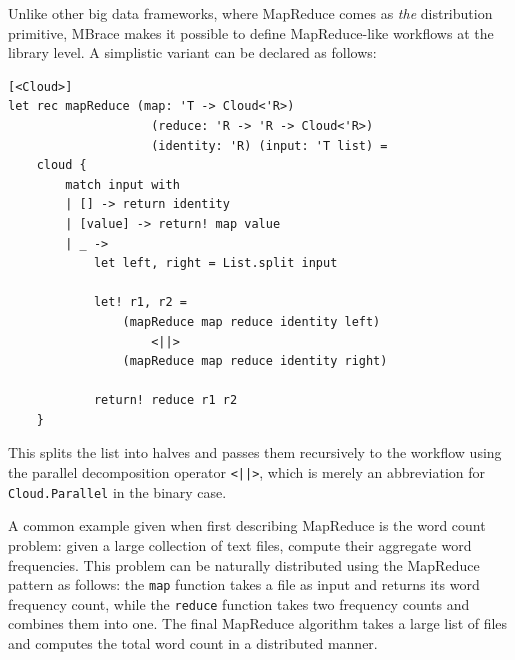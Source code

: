 \documentclass[9pt,a4paper]{article}
\newcommand{\mbrace}{MBrace}
\begin{document}
Unlike other big data frameworks, where MapReduce comes as \emph{the} distribution primitive,
\mbrace{} makes it possible to define MapReduce-like workflows at the library level. 
A simplistic variant can be declared as follows:
\begin{lstlisting}
[<Cloud>]
let rec mapReduce (map: 'T -> Cloud<'R>) 
				    (reduce: 'R -> 'R -> Cloud<'R>) 
                    (identity: 'R) (input: 'T list) =
    cloud {
        match input with
        | [] -> return identity
        | [value] -> return! map value
        | _ ->
            let left, right = List.split input
 
            let! r1, r2 =
            	(mapReduce map reduce identity left)
            		<||>
	            (mapReduce map reduce identity right)
 
            return! reduce r1 r2
    }
\end{lstlisting}
This splits the list into halves and passes them 
recursively to the workflow using the parallel decomposition operator \texttt{<||>},
which is merely an abbreviation for \texttt{Cloud.Parallel} in the binary case.

A common example given when first describing MapReduce is the word count problem:
given a large collection of text files, compute their aggregate word frequencies.
This problem can be naturally distributed using the MapReduce pattern as follows:
the \texttt{map} function takes a file as input and returns its word frequency
count, while the \texttt{reduce} function takes two frequency counts and combines 
them into one.
The final MapReduce algorithm takes a large list of files and computes the total word
count in a distributed manner.
\end{document}
